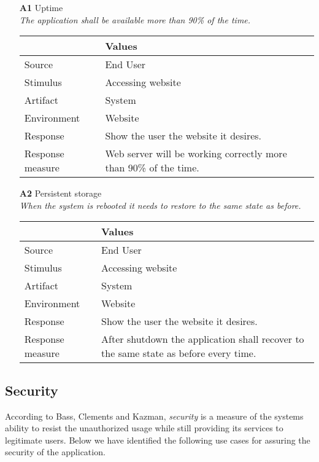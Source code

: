 \begin{itemize}
    \item[\textbf{A1}] Uptime \\
    \textit{\small{The application shall be available more than 90\% of the time.}}
        
    \begin{tabular}{| l | p{7cm} |}
        \hline
        \rowcolor[gray]{0.8}
        \textbf{} & \textbf{Values} \\
        \hline
        Source & End User \\
        Stimulus & Accessing website \\
        Artifact & System \\
        Environment & Website \\
        Response & Show the user the website it desires. \\
        Response measure & Web server will be working correctly more than 90\% of the time. \\
        \hline
    \end{tabular}

    \item[\textbf{A2}] Persistent storage \\
    \textit{\small{When the system is rebooted it needs to restore to the same state as before.}}
        
    \begin{tabular}{| l | p{7cm} |}
        \hline
        \rowcolor[gray]{0.8}
        \textbf{} & \textbf{Values} \\
        \hline
        Source & End User \\
        Stimulus & Accessing website \\
        Artifact & System \\
        Environment & Website \\
        Response & Show the user the website it desires. \\
        Response measure & After shutdown the application shall recover to the same state as before every time. \\
        \hline
    \end{tabular}
\end{itemize}

\subsection{Security}
According to Bass, Clements and Kazman, \emph{security} is a measure of the systems ability to resist the unauthorized usage while still providing its services to legitimate users\citep{ProgarkPensum}. Below we have identified the following use cases for assuring the security of the application.

